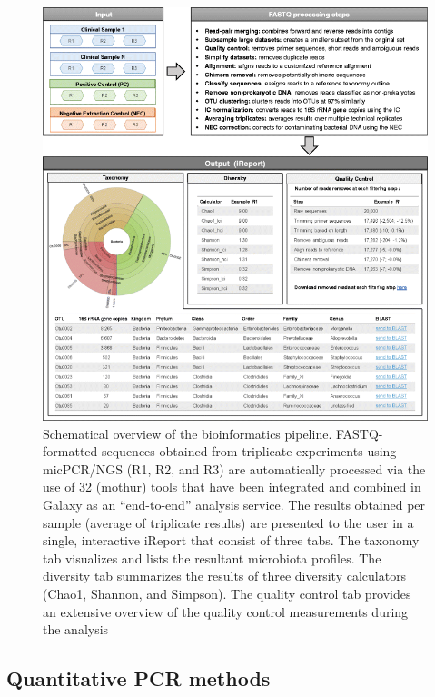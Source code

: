 \begin{figure}[t!]
\centering
\includegraphics[scale=0.5]{chapters/images/mycrobiota/mycrobiota-fig1.png}
\caption{Schematical overview of the bioinformatics pipeline. FASTQ-formatted sequences obtained from triplicate experiments using micPCR/NGS (R1, R2, and R3) are automatically processed via the use of 32 (mothur) tools that have been integrated and combined in Galaxy as an “end-to-end” analysis service. The results obtained per sample (average of triplicate results) are presented to the user in a single, interactive iReport that consist of three tabs. The taxonomy tab visualizes and lists the resultant microbiota profiles. The diversity tab summarizes the results of three diversity calculators (Chao1, Shannon, and Simpson). The quality control tab provides an extensive overview of the quality control measurements during the analysis}
\label{fig:mycrobiota-pipeline}
\end{figure}


\subsection*{Quantitative PCR methods}


